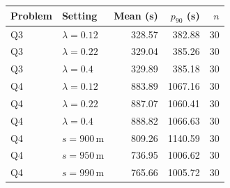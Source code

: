 \begin{tabular}{llrrr}
\toprule
Problem & Setting & Mean (s) & $p_{90}$ (s) & $n$ \\
\midrule
Q3 & $\lambda=0.12$ & 328.57 & 382.88 & 30 \\
Q3 & $\lambda=0.22$ & 329.04 & 385.26 & 30 \\
Q3 & $\lambda=0.4$ & 329.89 & 385.18 & 30 \\
Q4 & $\lambda=0.12$ & 883.89 & 1067.16 & 30 \\
Q4 & $\lambda=0.22$ & 887.07 & 1060.41 & 30 \\
Q4 & $\lambda=0.4$ & 888.82 & 1066.63 & 30 \\
Q4 & $s=900\,\mathrm{m}$ & 809.26 & 1140.59 & 30 \\
Q4 & $s=950\,\mathrm{m}$ & 736.95 & 1006.62 & 30 \\
Q4 & $s=990\,\mathrm{m}$ & 765.66 & 1005.72 & 30 \\
\bottomrule
\end{tabular}
